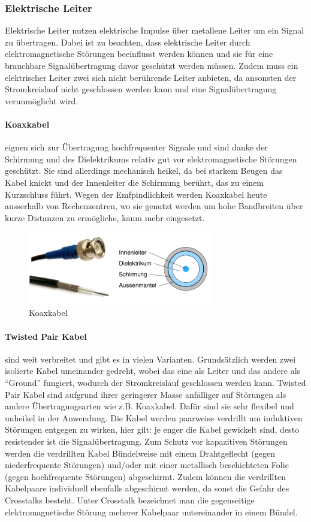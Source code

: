\documentclass{article}
\begin{document}
\subsubsection{Elektrische Leiter}
Elektrische Leiter nutzen elektrische Impulse über metallene Leiter um ein Signal zu übertragen. Dabei ist zu beachten, dass elektrische Leiter durch elektromagnetische Störungen beeinflusst werden können und sie für eine brauchbare Signalübertragung davor geschützt werden müssen. Zudem muss ein elektrischer Leiter zwei sich nicht berührende Leiter anbieten, da ansonsten der Stromkreislauf nicht geschlossen werden kann und eine Signalübertragung verunmöglicht wird.
\paragraph{Koaxkabel}
eignen sich zur Übertragung hochfrequenter Signale und sind danke der Schirmung und des Dielektrikums relativ gut vor elektromagnetische Störungen geschützt. Sie sind allerdings mechanisch heikel, da bei starkem Beugen das Kabel knickt und der Innenleiter die Schirmung berührt, das zu einem Kurzschluss führt. Wegen der Emfpindlichkeit werden Koaxkabel heute ausserhalb von Rechenzentren, wo sie genutzt werden um hohe Bandbreiten über kurze Distanzen zu ermögliche, kaum mehr eingesetzt.
\begin{figure}[h!]
		\begin{center}
		\includegraphics[width=8cm]{img/koax.png}
		\end{center}
		\caption{Koaxkabel}
		\label{fig:Koaxkabel}
\end{figure}
\paragraph{Twisted Pair Kabel}
sind weit verbreitet und gibt es in vielen Varianten. Grundsätzlich werden zwei isolierte Kabel umeinander gedreht, wobei das eine als Leiter und das andere als ``Ground'' fungiert, wodurch der Stromkreislauf geschlossen werden kann. Twisted Pair Kabel sind aufgrund ihrer geringerer Masse anfälliger auf Störungen als andere Übertragungsarten wie z.B. Koaxkabel. Dafür sind sie sehr flexibel und unheikel in der Anwendung. Die Kabel werden paarweise verdrillt um induktiven Störungen entgegen zu wirken, hier gilt: je enger die Kabel gewickelt sind, desto resistender ist die Signalübertragung. Zum Schutz vor kapazitiven Störungen werden die verdrillten Kabel Bündelweise mit einem Drahtgeflecht (gegen niederfrequente Störungen) und/oder  mit einer metallisch beschichteten Folie (gegen hochfrequente Störungen) abgeschirmt. Zudem können die verdrillten Kabelpaare individuell ebenfalls abgeschirmt werden, da sonst die Gefahr des Crosstalks besteht. Unter Crosstalk bezeichnet man die gegenseitige elektromagnetische Störung meherer Kabelpaar untereinander in einem Bündel.
\end{document}
